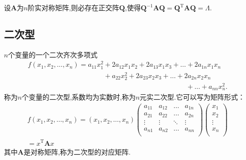 \begin{ttheorem}
    设$\mathbf{A}$为$n$阶实对称矩阵,则必存在正交阵$\mathbf{Q}$,使得$\mathbf{Q}^{-1}\mathbf{A}\mathbf{Q}=\mathbf{Q}^\mathrm{T}\mathbf{A}\mathbf{Q}=\varLambda $.
\end{ttheorem}

\subsection{二次型}
\begin{definition}
    $n$个变量的一个二次齐次多项式
    \begin{gather*}
        f(x_1,x_2,\dots,x_n)=a_{11}x_1^2+2a_{12}x_1x_2+2a_{13}x_1x_3+\dots+2a_{1n}x_1x_n\\
        \phantom{f(x_1,x_2,\dots,x_n)=a_{11}x_1^2}+a_{22}x_2^2+2a_{23}x_2x_3+\dots+2a_{2n}x_2x_n\\
        \phantom{f(x_1,x_2,\dots,x_n)=a_{11}x_1^2+2a_{12}x_1x_2+2a_{13}x_1x_3+\dots}+\dots+a_{nn}x_n^2.
    \end{gather*}
    称为$n$个变量的二次型,系数均为实数时,称为$n$元实二次型.它可以写为矩阵形式：
    \begin{gather*}
        f(x_1,x_2,\dots,x_n)=(x_1,x_2,\dots,x_n)\begin{pmatrix}
            a_{11}   &   a_{12}   &   \dots   &   a_{1n}   \\
            a_{21}   &   a_{22}   &   \dots   &   a_{2n}   \\
            \vdots   &   \vdots   &   \ddots   &   \vdots   \\
            a_{n1}   &   a_{n2}   &   \dots   &   a_{nn}   \\
        \end{pmatrix}
        \begin{pmatrix}
            x_1  \\
            x_2  \\
            \vdots  \\
            x_n  \\
        \end{pmatrix}\\
        =x^\mathrm{T}\mathbf{A}x
    \end{gather*}
    其中$\mathbf{A}$是对称矩阵,称为二次型的对应矩阵.
\end{definition}
